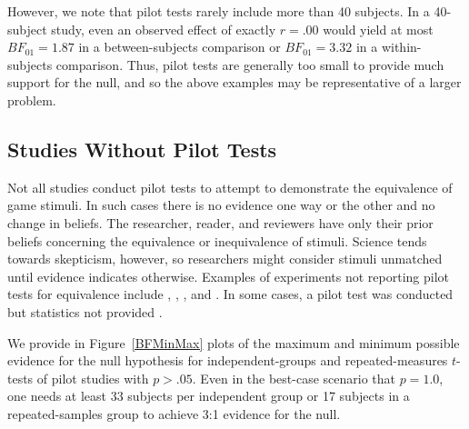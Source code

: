 \documentclass[man]{apa6}
\begin{document}
However, we note that pilot tests rarely include more than 40 subjects. In a 40-subject study, even an observed effect of exactly $r = .00$ would yield at most $BF_{01} = 1.87$ in a between-subjects comparison or $BF_{01} = 3.32$ in a within-subjects comparison. Thus, pilot tests are generally too small to provide much support for the null, and so the above examples may be representative of a larger problem.

\subsection{Studies Without Pilot Tests}
Not all studies conduct pilot tests to attempt to demonstrate the equivalence of game stimuli. In such cases there is no evidence one way or the other and no change in beliefs. The researcher, reader, and reviewers have only their prior beliefs concerning the equivalence or inequivalence of stimuli. Science tends towards skepticism, however, so researchers might consider stimuli unmatched until evidence indicates otherwise. Examples of experiments not reporting pilot tests for equivalence include \citet{Bartholow:Anderson:2002}, \citet{Bartholow:etal:2006}, %
\citet{Bartholow:etal:2005}, and \citet{Hasan:etal:2012}. In some cases, a pilot test was conducted but statistics not provided \citep[e.g.,][]{Engelhardt:etal:2011}. 

We provide in Figure~\ref{BFMinMax} plots of the maximum and minimum possible evidence for the null hypothesis for independent-groups and repeated-measures $t$-tests of pilot studies with $p > .05$. Even in the best-case scenario that $p = 1.0$, one needs at least 33 subjects per independent group or 17 subjects in a repeated-samples group to achieve 3:1 evidence for the null. 
\end{document}
